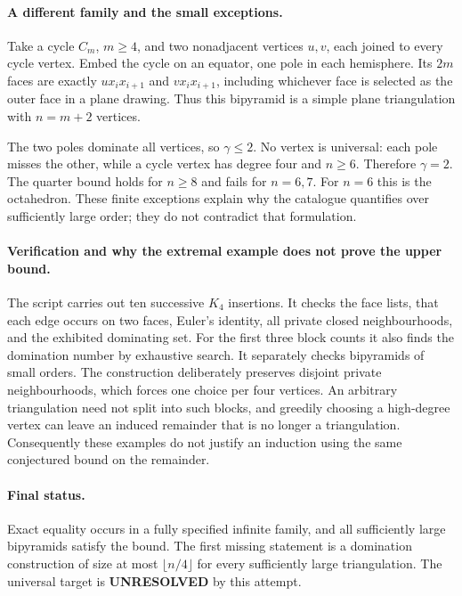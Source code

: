 \documentclass[11pt,a4paper]{article}
\begin{document}
\paragraph{A different family and the small exceptions.}
Take a cycle $C_m$, $m\ge4$, and two nonadjacent vertices $u,v$, each joined to every cycle vertex. Embed the cycle on an equator, one pole in each hemisphere. Its $2m$ faces are exactly $ux_ix_{i+1}$ and $vx_ix_{i+1}$, including whichever face is selected as the outer face in a plane drawing. Thus this bipyramid is a simple plane triangulation with $n=m+2$ vertices.

The two poles dominate all vertices, so $\gamma\le2$. No vertex is universal: each pole misses the other, while a cycle vertex has degree four and $n\ge6$. Therefore $\gamma=2$. The quarter bound holds for $n\ge8$ and fails for $n=6,7$. For $n=6$ this is the octahedron. These finite exceptions explain why the catalogue quantifies over sufficiently large order; they do not contradict that formulation.

\paragraph{Verification and why the extremal example does not prove the upper bound.}
The script carries out ten successive $K_4$ insertions. It checks the face lists, that each edge occurs on two faces, Euler's identity, all private closed neighbourhoods, and the exhibited dominating set. For the first three block counts it also finds the domination number by exhaustive search. It separately checks bipyramids of small orders. The construction deliberately preserves disjoint private neighbourhoods, which forces one choice per four vertices. An arbitrary triangulation need not split into such blocks, and greedily choosing a high-degree vertex can leave an induced remainder that is no longer a triangulation. Consequently these examples do not justify an induction using the same conjectured bound on the remainder.

\paragraph{Final status.}
Exact equality occurs in a fully specified infinite family, and all sufficiently large bipyramids satisfy the bound. The first missing statement is a domination construction of size at most $\lfloor n/4\rfloor$ for every sufficiently large triangulation. The universal target is \textbf{UNRESOLVED} by this attempt.
\end{document}
